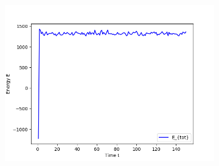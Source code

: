 \begin{figure}[ht]
\begin{subfigure}{0.3\textwidth}
\includegraphics[width=\textwidth]{../dat/Total_Energy_T2d0.png}
\end{subfigure}


\end{figure}
